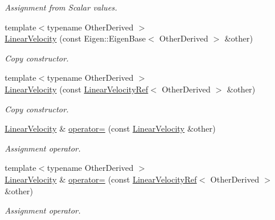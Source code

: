 \begin{DoxyCompactItemize}
\begin{DoxyCompactList}\small\item\em Assignment from Scalar values. \end{DoxyCompactList}\item 
{\footnotesize template$<$typename Other\+Derived $>$ }\\\hyperlink{classow__core_1_1LinearVelocity_abf23b69f78de0e66c5df1d928162ce8f}{Linear\+Velocity} (const Eigen\+::\+Eigen\+Base$<$ Other\+Derived $>$ \&other)
\begin{DoxyCompactList}\small\item\em Copy constructor. \end{DoxyCompactList}\item 
{\footnotesize template$<$typename Other\+Derived $>$ }\\\hyperlink{classow__core_1_1LinearVelocity_a477b41821b89c9ac044acb075eda0c6d}{Linear\+Velocity} (const \hyperlink{classow__core_1_1LinearVelocityRef}{Linear\+Velocity\+Ref}$<$ Other\+Derived $>$ \&other)
\begin{DoxyCompactList}\small\item\em Copy constructor. \end{DoxyCompactList}\item 
\hyperlink{classow__core_1_1LinearVelocity}{Linear\+Velocity} \& \hyperlink{classow__core_1_1LinearVelocity_a9aff74f24ce2a2025869429e096fb9b8}{operator=} (const \hyperlink{classow__core_1_1LinearVelocity}{Linear\+Velocity} \&other)\hypertarget{classow__core_1_1LinearVelocity_a9aff74f24ce2a2025869429e096fb9b8}{}\label{classow__core_1_1LinearVelocity_a9aff74f24ce2a2025869429e096fb9b8}

\begin{DoxyCompactList}\small\item\em Assignment operator. \end{DoxyCompactList}\item 
{\footnotesize template$<$typename Other\+Derived $>$ }\\\hyperlink{classow__core_1_1LinearVelocity}{Linear\+Velocity} \& \hyperlink{classow__core_1_1LinearVelocity_a5d896779597f4725c7a371f57b7a9172}{operator=} (const \hyperlink{classow__core_1_1LinearVelocityRef}{Linear\+Velocity\+Ref}$<$ Other\+Derived $>$ \&other)\hypertarget{classow__core_1_1LinearVelocity_a5d896779597f4725c7a371f57b7a9172}{}\label{classow__core_1_1LinearVelocity_a5d896779597f4725c7a371f57b7a9172}

\begin{DoxyCompactList}\small\item\em Assignment operator. \end{DoxyCompactList}\end{DoxyCompactItemize}


